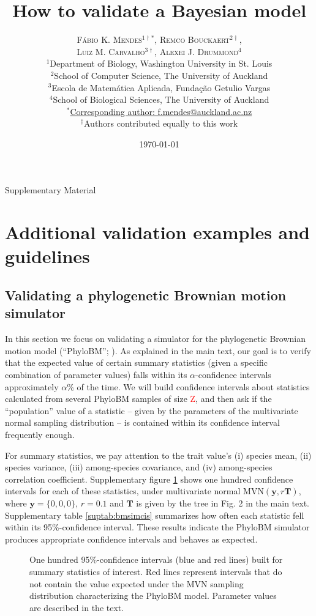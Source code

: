 \documentclass[oneside]{article}
\title{How to validate a Bayesian model} %
\author{\textsc{F\'{a}bio K. Mendes$^{1\dagger*}$}, \textsc{Remco Bouckaert$^{2\dagger}$},\\
\textsc{Luiz M. Carvalho$^{3\dagger}$}, \textsc{Alexei J. Drummond$^{4}$} \\
\small $^1$Department of Biology, Washington University in St. Louis\\
\small $^2$School of Computer Science, The University of Auckland\\
\small $^3$Escola de Matem\'{a}tica Aplicada, Fundaç\~{a}o Getulio Vargas\\
\small $^4$School of Biological Sciences, The University of Auckland\\
\small
\href{mailto:f.mendes@auckland.ac.nz}{$^*$Corresponding author: f.mendes@auckland.ac.nz}\\
{\small $^\dagger$Authors contributed equally to this work}
}
\date{\today} %
\begin{document}
\maketitle

\begin{center}
    \Large Supplementary Material
\end{center}

\newpage
\section{Additional validation examples and guidelines}

\subsection{Validating a phylogenetic Brownian motion simulator}

In this section we focus on validating a simulator for the phylogenetic Brownian motion
model (``PhyloBM''; \citealp{felsenstein73}).
As explained in the main text, our goal is to verify that the expected value of certain
summary statistics (given a specific combination of parameter values) falls within its
$\alpha$-confidence intervals approximately $\alpha$\% of the time.
We will build confidence intervals about statistics calculated from several PhyloBM
samples of size \textcolor{red}{Z}, and then ask if the ``population'' value of 
a statistic -- given by the parameters of the multivariate normal sampling distribution --
is contained within its confidence interval frequently enough.

For summary statistics, we pay attention to the trait value's (i) species mean, (ii)
species variance, (iii) among-species covariance, and (iv) among-species correlation
coefficient.
Supplementary figure \ref{supfig:bmsimcis} shows one hundred confidence intervals for
each of these statistics, under multivariate normal $\text{MVN}(\boldsymbol{y},r\boldsymbol{T})$,
where $\boldsymbol{y}=\{0,0,0\}$, $r=0.1$ and $\boldsymbol{T}$ is given by the tree in
Fig. 2 in the main text.
Supplementary table \ref{suptab:bmsimcis} summarizes how often each statistic fell within
its 95\%-confidence interval.
These results indicate the PhyloBM simulator produces appropriate confidence intervals and behaves as expected.

\begin{figure}
  \centering
  
  \caption{One hundred 95\%-confidence intervals (blue and red
    lines) built for summary statistics of interest.
    Red lines represent intervals that do not contain the value
    expected under the MVN sampling distribution characterizing
    the PhyloBM model.
    Parameter values are described in the text.}
  \label{supfig:bmsimcis}
\end{figure}
\end{document}
